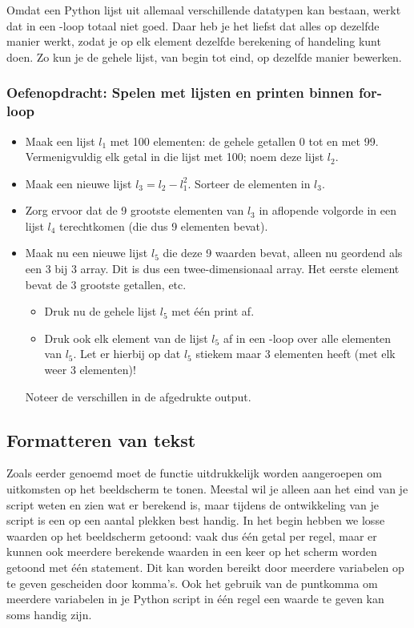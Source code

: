 \documentclass[a4paper,11pt, fleqn]{article}
\begin{document}

Omdat een Python lijst uit allemaal verschillende datatypen kan bestaan, werkt dat in een -loop totaal niet goed. Daar heb je het liefst dat alles op dezelfde manier werkt, zodat je op elk element dezelfde berekening of handeling kunt doen.
Zo kun je de gehele lijst, van begin tot eind, op dezelfde manier bewerken.

\subsubsection*{Oefenopdracht: Spelen met lijsten en printen binnen for-loop} 

\begin{itemize}
\item Maak een  lijst $l_1$ met 100 elementen: de gehele getallen 0 tot en met 99.
Vermenigvuldig elk getal in die lijst met 100; noem deze lijst $l_2$.
\item Maak een nieuwe lijst $ l_3 = l_2 - l_1^2$.
Sorteer de elementen in $l_3$. 
\item Zorg ervoor dat de 9 grootste elementen van $l_3$ in aflopende volgorde in een lijst $l_4$ terechtkomen (die dus 9 elementen bevat).
\item Maak nu een nieuwe lijst $l_5$ die deze 9 waarden bevat, alleen nu geordend als een 3 bij 3 array. Dit is dus een twee-dimensionaal array. Het eerste element bevat de 3 grootste getallen, etc.
 \begin{itemize}
  \item Druk nu de gehele lijst $l_5$ met \'e\'en print af. 
  \item Druk ook elk element van de lijst $l_5$ af in een -loop over alle elementen van $l_5$. Let er hierbij op dat $l_5$ stiekem maar 3 elementen heeft (met elk weer 3 elementen)! 
 \end{itemize}
 Noteer de verschillen in de afgedrukte output. 
\end{itemize}

\subsection{Formatteren van tekst}
\label{sec:format}

Zoals eerder genoemd moet de functie  uitdrukkelijk worden aangeroepen om uitkomsten op het beeldscherm te tonen. Meestal wil je alleen aan het eind van je script weten en zien wat er berekend is, maar tijdens de ontwikkeling van je script is een  op een aantal plekken best handig.
In het begin hebben we losse waarden op het beeldscherm getoond: vaak dus \'e\'en getal per regel, maar er kunnen ook meerdere berekende waarden in een keer op het scherm worden getoond met \'e\'en  statement. Dit kan worden bereikt door meerdere variabelen op te geven gescheiden door komma's. Ook het gebruik van de puntkomma om  meerdere variabelen in je Python script in \'e\'en regel een waarde te geven kan soms handig zijn.
\end{document}

